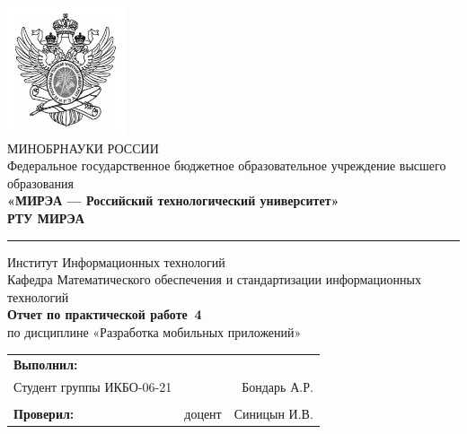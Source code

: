 \begin{titlepage}
	
	\thispagestyle{fancy}
	\renewcommand{\headrulewidth}{0pt}
	\setlength{\headheight}{17.0pt}

	\begin{center}
		\includegraphics[scale=0.5]{./res/logo}\\ %
		МИНОБРНАУКИ РОССИИ\\
		Федеральное государственное бюджетное образовательное
		учреждение высшего образования\\
		\textbf{«МИРЭА --- Российский технологический университет»}\\
		\textbf{\large РТУ МИРЭА}\\
		\bigskip \hrule \smallskip
		Институт Информационных технологий\\
		\vfill
		Кафедра Математического обеспечения и стандартизации
		информационных технологий\\
		\vfill
		\textbf{\large Отчет по практической работе \No\,4}\\
		по дисциплине «Разработка мобильных приложений»\\
		\vfill
		\vfill
		\begin{tabular}{lrr}
			\textbf{Выполнил:} & &\\
			Студент группы ИКБО-06-21 & & Бондарь А.Р. \\\\
			\textbf{Проверил:} &  доцент & Синицын И.В. \\
		\end{tabular}
		\vfill
	\end{center}
\end{titlepage}
\setcounter{page}{2}
\clearpage

